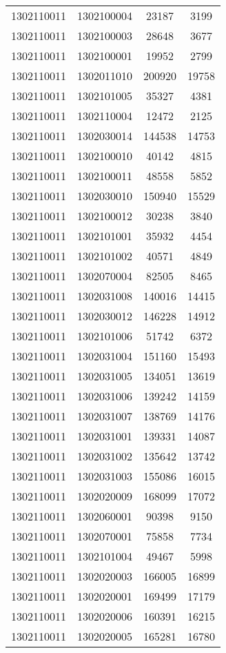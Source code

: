 \begin{longtable}{llcc}
1302110011 & 1302100004 & 23187 & 3199\\
1302110011 & 1302100003 & 28648 & 3677\\
1302110011 & 1302100001 & 19952 & 2799\\
1302110011 & 1302011010 & 200920 & 19758\\
1302110011 & 1302101005 & 35327 & 4381\\
1302110011 & 1302110004 & 12472 & 2125\\
1302110011 & 1302030014 & 144538 & 14753\\
1302110011 & 1302100010 & 40142 & 4815\\
1302110011 & 1302100011 & 48558 & 5852\\
1302110011 & 1302030010 & 150940 & 15529\\
1302110011 & 1302100012 & 30238 & 3840\\
1302110011 & 1302101001 & 35932 & 4454\\
1302110011 & 1302101002 & 40571 & 4849\\
1302110011 & 1302070004 & 82505 & 8465\\
1302110011 & 1302031008 & 140016 & 14415\\
1302110011 & 1302030012 & 146228 & 14912\\
1302110011 & 1302101006 & 51742 & 6372\\
1302110011 & 1302031004 & 151160 & 15493\\
1302110011 & 1302031005 & 134051 & 13619\\
1302110011 & 1302031006 & 139242 & 14159\\
1302110011 & 1302031007 & 138769 & 14176\\
1302110011 & 1302031001 & 139331 & 14087\\
1302110011 & 1302031002 & 135642 & 13742\\
1302110011 & 1302031003 & 155086 & 16015\\
1302110011 & 1302020009 & 168099 & 17072\\
1302110011 & 1302060001 & 90398 & 9150\\
1302110011 & 1302070001 & 75858 & 7734\\
1302110011 & 1302101004 & 49467 & 5998\\
1302110011 & 1302020003 & 166005 & 16899\\
1302110011 & 1302020001 & 169499 & 17179\\
1302110011 & 1302020006 & 160391 & 16215\\
1302110011 & 1302020005 & 165281 & 16780\\

\end{longtable}
